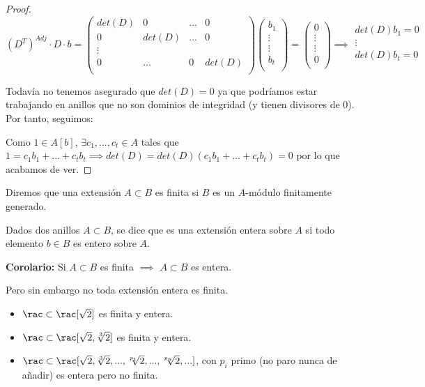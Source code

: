 \begin{proof}
	$$ (D^T)^{Adj}\cdot D \cdot b = \left( \begin{array}{cccc}
	det(D) & 0 & \dots & 0 \\
	0 & det(D) & \dots & 0 \\
	\vdots &  & &  \\
	0 & \dots & 0 & det(D)\\
	\end{array}
	\right) \left( \begin{array}{c}
	b_1 \\
	\vdots \\
	\vdots \\
	b_t\\
	\end{array}
	\right) =
	\left( \begin{array}{c}
	0 \\
	\vdots\\
	\vdots \\
	0\\
	\end{array}
	\right) \implies
	\begin{array}{c}
	det(D)b_1=0 \\
	\vdots\\
	det(D)b_t=0\\
	\end{array}
$$

Todavía no tenemos asegurado que $det(D)=0$ ya que podríamos estar trabajando en anillos que no son dominios de integridad (y tienen divisores de 0). Por tanto, seguimos:

	 Como $1 \in A[b]$, $\exists c_1,...,c_t \in A$ tales que $1=c_1b_1+...+c_tb_t \implies det(D)=det(D)(c_1b_1+...+c_tb_t)=0$ por lo que acabamos de ver.
\end{proof}

\begin{defn}
	Diremos que una extensión $A \subset B$ es finita si $B$ es un $A$-módulo finitamente generado.
\end{defn}

\begin{defn} Dados dos anillos $A ⊂ B$, se dice que es una extensión entera sobre $A$ si todo elemento $b ∈ B$ es entero sobre $A$.
\end{defn}

\textbf{Corolario:} Si $A\subset B$ es finita $\implies$ $A \subset B$ es entera.

Pero sin embargo no toda extensión entera es finita.
\begin{example}
	\begin{itemize}
		\item $\rac \subset \rac[\sqrt{2}]$ es finita y entera.
		\item $\rac \subset \rac[\sqrt{2}, \sqrt[3]{2}]$ es finita y entera.
		\item $\rac \subset \rac[\sqrt{2}, \sqrt[3]{2},..., \sqrt[p_1]{2},...,\sqrt[p_n]{2},...]$, con $p_i$ primo (no paro nunca de añadir) es entera pero no finita.
	\end{itemize}
\end{example}

